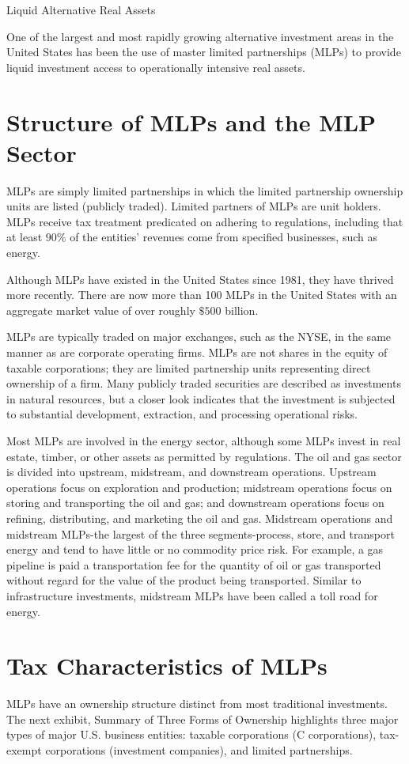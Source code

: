 \documentclass[11pt]{article}
\begin{document}
Liquid Alternative Real Assets

One of the largest and most rapidly growing alternative investment areas in the United States has been the use of master limited partnerships (MLPs) to provide liquid investment access to operationally intensive real assets.

\section*{Structure of MLPs and the MLP Sector}
MLPs are simply limited partnerships in which the limited partnership ownership units are listed (publicly traded). Limited partners of MLPs are unit holders. MLPs receive tax treatment predicated on adhering to regulations, including that at least $90 \%$ of the entities' revenues come from specified businesses, such as energy.

Although MLPs have existed in the United States since 1981, they have thrived more recently. There are now more than 100 MLPs in the United States with an aggregate market value of over roughly $\$ 500$ billion.

MLPs are typically traded on major exchanges, such as the NYSE, in the same manner as are corporate operating firms. MLPs are not shares in the equity of taxable corporations; they are limited partnership units representing direct ownership of a firm. Many publicly traded securities are described as investments in natural resources, but a closer look indicates that the investment is subjected to substantial development, extraction, and processing operational risks.

Most MLPs are involved in the energy sector, although some MLPs invest in real estate, timber, or other assets as permitted by regulations. The oil and gas sector is divided into upstream, midstream, and downstream operations. Upstream operations focus on exploration and production; midstream operations focus on storing and transporting the oil and gas; and downstream operations focus on refining, distributing, and marketing the oil and gas. Midstream operations and midstream MLPs-the largest of the three segments-process, store, and transport energy and tend to have little or no commodity price risk. For example, a gas pipeline is paid a transportation fee for the quantity of oil or gas transported without regard for the value of the product being transported. Similar to infrastructure investments, midstream MLPs have been called a toll road for energy.

\section*{Tax Characteristics of MLPs}
MLPs have an ownership structure distinct from most traditional investments. The next exhibit, Summary of Three Forms of Ownership highlights three major types of major U.S. business entities: taxable corporations (C corporations), tax-exempt corporations (investment companies), and limited partnerships.
\end{document}
